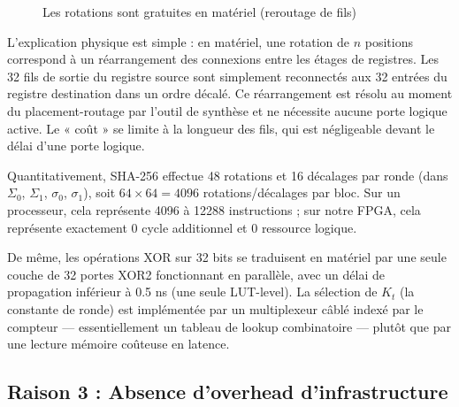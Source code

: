 \begin{figure}[H]
\centering
{}
\caption{Les rotations sont gratuites en matériel (reroutage de fils)}
\label{fig:rotr_free}
\end{figure}

L'explication physique est simple : en matériel, une rotation de $n$ positions correspond à un réarrangement des connexions entre les étages de registres. Les 32 fils de sortie du registre source sont simplement reconnectés aux 32 entrées du registre destination dans un ordre décalé. Ce réarrangement est résolu au moment du placement-routage par l'outil de synthèse et ne nécessite aucune porte logique active. Le « coût » se limite à la longueur des fils, qui est négligeable devant le délai d'une porte logique.

Quantitativement, SHA-256 effectue 48 rotations et 16 décalages par ronde (dans $\Sigma_0$, $\Sigma_1$, $\sigma_0$, $\sigma_1$), soit $64 \times 64 = 4096$ rotations/décalages par bloc. Sur un processeur, cela représente 4096 à 12288 instructions ; sur notre FPGA, cela représente exactement 0 cycle additionnel et 0 ressource logique.

De même, les opérations XOR sur 32 bits se traduisent en matériel par une seule couche de 32 portes XOR2 fonctionnant en parallèle, avec un délai de propagation inférieur à 0.5 ns (une seule LUT-level). La sélection de $K_t$ (la constante de ronde) est implémentée par un multiplexeur câblé indexé par le compteur --- essentiellement un tableau de lookup combinatoire --- plutôt que par une lecture mémoire coûteuse en latence.

\subsection{Raison 3 : Absence d'overhead d'infrastructure}

